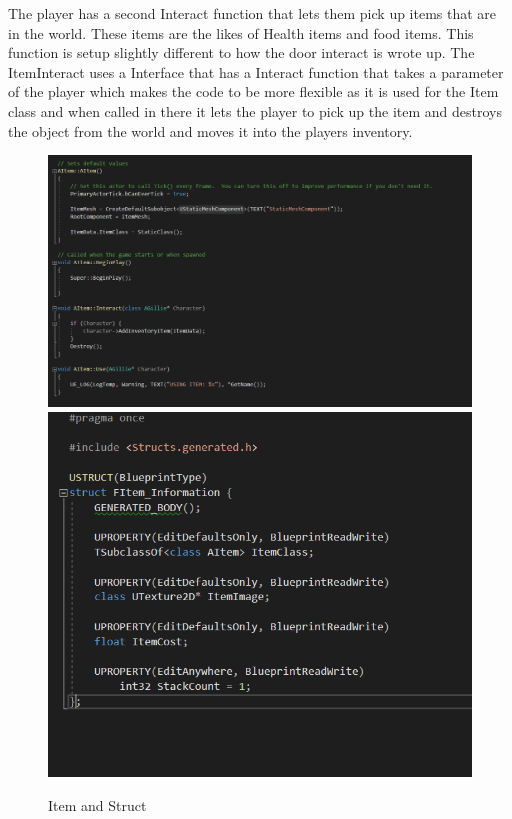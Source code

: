\newline
\newline
The player has a second Interact function that lets them pick up items that are in the world. These items are the likes of Health items and food items. This function is setup slightly different to how the door interact is wrote up. The ItemInteract uses a Interface that has a Interact function that takes a parameter of the player which makes the code to be more flexible as it is used for the Item class and when called in there it lets the player to pick up the item and destroys the object from the world and moves it into the players inventory.
\newline
\newline
\begin{figure}[H]
    \centering
    \includegraphics[scale=.3]{img/Item.PNG}
    \includegraphics[scale=.5]{img/Struct.PNG}
    \caption{Item and Struct}
    \label{Item and Struct}
\end{figure}
